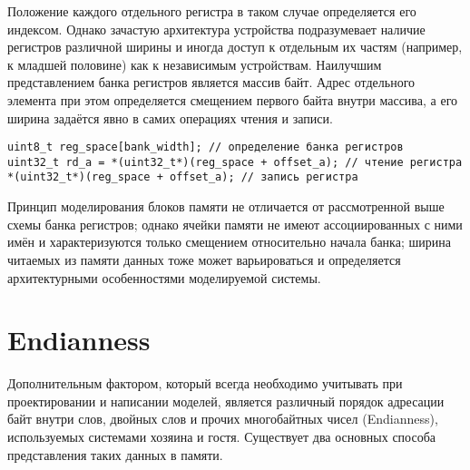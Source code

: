 Положение каждого отдельного регистра в таком случае определяется его индексом. Однако зачастую архитектура устройства подразумевает наличие регистров различной ширины и иногда доступ к отдельным их частям (например, к младшей половине)  как к независимым устройствам. Наилучшим представлением банка регистров является массив байт. Адрес отдельного элемента при этом определяется смещением первого байта внутри массива, а его ширина задаётся явно в самих операциях чтения и записи.

\begin{lstlisting}
uint8_t reg_space[bank_width]; // определение банка регистров
uint32_t rd_a = *(uint32_t*)(reg_space + offset_a); // чтение регистра
*(uint32_t*)(reg_space + offset_a); // запись регистра  
\end{lstlisting}

Принцип моделирования блоков памяти не отличается от рассмотренной выше схемы банка регистров; однако ячейки памяти не имеют ассоциированных с ними имён и характеризуются только смещением относительно начала банка; ширина читаемых из памяти данных тоже может варьироваться и определяется архитектурными особенностями моделируемой системы.

\section{Endianness}


Дополнительным фактором, который всегда необходимо учитывать при проектировании и написании моделей, является различный порядок адресации байт внутри слов, двойных слов и прочих многобайтных чисел (\abbr Endianness), используемых системами хозяина и гостя. Существует два основных способа представления таких данных в памяти.

